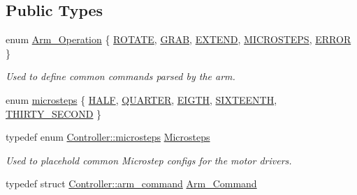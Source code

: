 \subsection*{Public Types}
\begin{DoxyCompactItemize}
\item 
enum \hyperlink{class_controller_a91a5751dd6920daf3b70814171b51767}{Arm\+\_\+\+Operation} \{ \newline
\hyperlink{class_controller_a91a5751dd6920daf3b70814171b51767a99ba9596fbe683c122b76174e7d40b8e}{R\+O\+T\+A\+TE}, 
\hyperlink{class_controller_a91a5751dd6920daf3b70814171b51767a41ed83326fd9ad04a2d24a228bc7a7ef}{G\+R\+AB}, 
\hyperlink{class_controller_a91a5751dd6920daf3b70814171b51767a1f9769fc0e78abe69b7a4ad5d573eb6c}{E\+X\+T\+E\+ND}, 
\hyperlink{class_controller_a91a5751dd6920daf3b70814171b51767a7d0e6ebddd2cb5dc5fb2100c018cc6d8}{M\+I\+C\+R\+O\+S\+T\+E\+PS}, 
\newline
\hyperlink{class_controller_a91a5751dd6920daf3b70814171b51767ae276bf8b30c8b606b54d8fb7d92c1ee6}{E\+R\+R\+OR}
 \}\begin{DoxyCompactList}\small\item\em Used to define common commands parsed by the arm. \end{DoxyCompactList}
\item 
enum \hyperlink{class_controller_aa94f1aea40982c422a43c1ee5aea0c49}{microsteps} \{ \newline
\hyperlink{class_controller_aa94f1aea40982c422a43c1ee5aea0c49a7c6a23455db73e86dcfafcb0025ac5dd}{H\+A\+LF}, 
\hyperlink{class_controller_aa94f1aea40982c422a43c1ee5aea0c49aa4e1dc476afca095736e176eb109dc11}{Q\+U\+A\+R\+T\+ER}, 
\hyperlink{class_controller_aa94f1aea40982c422a43c1ee5aea0c49a99f575098d1be025c224acc42fd921a0}{E\+I\+G\+TH}, 
\hyperlink{class_controller_aa94f1aea40982c422a43c1ee5aea0c49af214e4647ac3115a559b96a464219371}{S\+I\+X\+T\+E\+E\+N\+TH}, 
\newline
\hyperlink{class_controller_aa94f1aea40982c422a43c1ee5aea0c49aad17f41f310f462eb36ac9f6bac29b57}{T\+H\+I\+R\+T\+Y\+\_\+\+S\+E\+C\+O\+ND}
 \}
\item 
typedef enum \hyperlink{class_controller_aa94f1aea40982c422a43c1ee5aea0c49}{Controller\+::microsteps} \hyperlink{class_controller_ab45ad0d63abd4b57021f13810fc856d3}{Microsteps}
\begin{DoxyCompactList}\small\item\em Used to placehold common Microstep configs for the motor drivers. \end{DoxyCompactList}\item 
typedef struct \hyperlink{struct_controller_1_1arm__command}{Controller\+::arm\+\_\+command} \hyperlink{class_controller_a1b06b7601d97a4d4bb4071938df87076}{Arm\+\_\+\+Command}
\end{DoxyCompactItemize}
